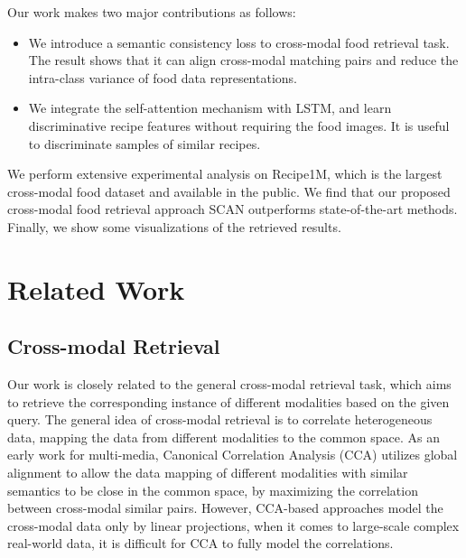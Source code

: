 \documentclass[journal]{IEEEtran}
\begin{document}
Our work makes two major contributions as follows:
\begin{itemize}
   \item We introduce a semantic consistency loss to cross-modal food retrieval task. The result shows that it can align cross-modal matching pairs and reduce the intra-class variance of food data representations.
   \item We integrate the self-attention mechanism with LSTM, and learn discriminative recipe features without requiring the food images. It is useful to discriminate samples of similar recipes.
\end{itemize}

We perform extensive experimental analysis on Recipe1M, which is the largest cross-modal food dataset and available in the public. We find that our proposed cross-modal food retrieval approach SCAN outperforms state-of-the-art methods. Finally, we show some visualizations of the retrieved results.

\section{Related Work}
\subsection{Cross-modal Retrieval}
Our work is closely related to the general cross-modal retrieval task, which aims to retrieve the corresponding instance of different modalities based on the given query. The general idea of cross-modal retrieval is to correlate heterogeneous data, mapping the data from different modalities to the common space. As an early work for multi-media, Canonical Correlation Analysis (CCA) \cite{hotelling1936relations} utilizes global alignment to allow the data mapping of different modalities with similar semantics to be close in the common space, by maximizing the correlation between cross-modal similar pairs. However, CCA-based approaches model the cross-modal data only by linear projections, when it comes to large-scale complex real-world data, it is difficult for CCA to fully model the correlations.
 
\end{document}
